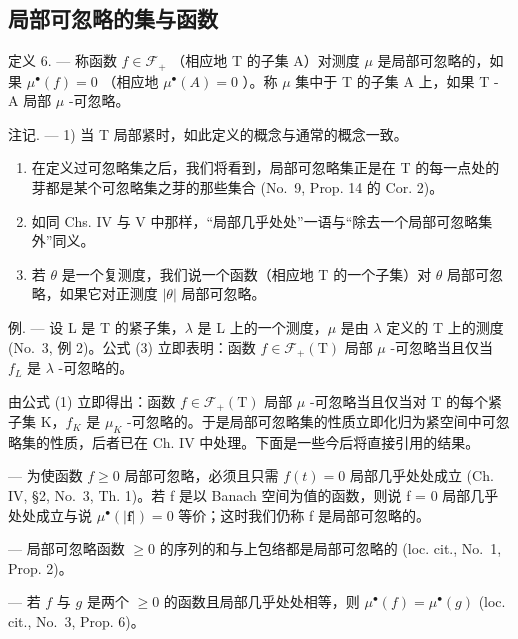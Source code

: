 \subsection{局部可忽略的集与函数}

定义 6. --- 称函数 \(f \in \mathcal{F}_{+}\) （相应地 T 的子集 A）对测度 \(\mu\) 是局部可忽略的，如果 \(\mu^{\bullet}(f) = 0\) （相应地 \(\mu^{\bullet}(A) = 0\) ）。称 \(\mu\) 集中于 T 的子集 A 上，如果 T - A 局部 \(\mu\) -可忽略。

注记. --- 1) 当 T 局部紧时，如此定义的概念与通常的概念一致。

\begin{enumerate}
\def\labelenumi{\arabic{enumi})}
\setcounter{enumi}{1}
\item
  在定义过可忽略集之后，我们将看到，局部可忽略集正是在 T 的每一点处的芽都是某个可忽略集之芽的那些集合 (No.~9, Prop. 14 的 Cor. 2)。
\item
  如同 Chs. IV 与 V 中那样，“局部几乎处处”一语与“除去一个局部可忽略集外”同义。
\item
  若 \(\theta\) 是一个复测度，我们说一个函数（相应地 T 的一个子集）对 \(\theta\) 局部可忽略，如果它对正测度 \(|\theta|\) 局部可忽略。
\end{enumerate}

例. --- 设 L 是 T 的紧子集，\(\lambda\) 是 L 上的一个测度，\(\mu\) 是由 \(\lambda\) 定义的 T 上的测度 (No.~3, 例 2)。公式 (3) 立即表明：函数 \(f \in \mathcal{F}_{+}(\mathrm{T})\) 局部 \(\mu\) -可忽略当且仅当 \(f_{L}\) 是 \(\lambda\) -可忽略的。

由公式 (1) 立即得出：函数 \(f \in \mathcal{F}_{+}(\mathrm{T})\) 局部 \(\mu\) -可忽略当且仅当对 T 的每个紧子集 K，\(f_{K}\) 是 \(\mu_{K}\) -可忽略的。于是局部可忽略集的性质立即化归为紧空间中可忽略集的性质，后者已在 Ch. IV 中处理。下面是一些今后将直接引用的结果。

--- 为使函数 \(f \geqslant 0\) 局部可忽略，必须且只需 \(f(t) = 0\) 局部几乎处处成立 (Ch. IV, §2, No.~3, Th. 1)。若 f 是以 Banach 空间为值的函数，则说 f = 0 局部几乎处处成立与说 \(\mu^{\bullet}(|\mathbf{f}|) = 0\) 等价；这时我们仍称 f 是局部可忽略的。

--- 局部可忽略函数 \(\geqslant0\) 的序列的和与上包络都是局部可忽略的 (loc. cit., No.~1, Prop. 2)。

--- 若 \(f\) 与 \(g\) 是两个 \(\geqslant 0\) 的函数且局部几乎处处相等，则 \(\mu^{\bullet}(f) = \mu^{\bullet}(g)\) (loc. cit., No.~3, Prop. 6)。

